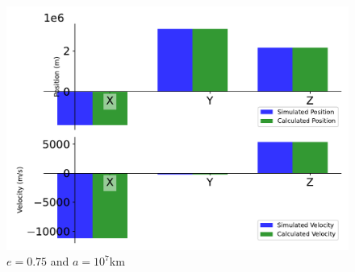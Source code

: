 \begin{figure}[htbp]\centerline{\includegraphics[height=0.7\textwidth, keepaspectratio]{AutoTeX/IncEllip_e_2}}\caption{$e = 0.75$ and $a = 10^7$km}\label{fig:IncEllip_e_2}\end{figure}